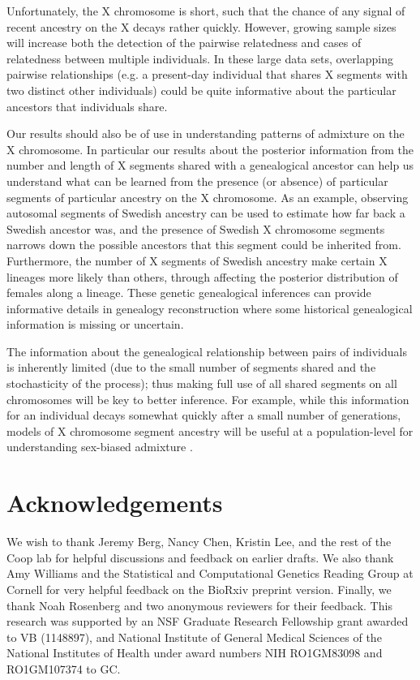 \documentclass[11pt]{article}
\begin{document}
Unfortunately, the X chromosome is short, such that the chance of any signal of
recent ancestry on the X decays rather quickly. However, growing sample sizes
will increase both the detection of the pairwise relatedness and cases of
relatedness between multiple individuals. In these large data sets, overlapping
pairwise relationships (e.g. a present-day individual that shares X segments
with two distinct other individuals) could be quite informative about the
particular ancestors that individuals share. 

Our results should also be of use in understanding patterns of admixture on the
X chromosome. In particular our results about the posterior information from
the number and length of X segments shared with a genealogical ancestor can
help us understand what can be learned from the presence (or absence) of
particular segments of particular ancestry on the X chromosome. As an example,
observing autosomal segments of Swedish ancestry can be used to estimate how
far back a Swedish ancestor was, and the presence of Swedish X chromosome
segments narrows down the possible ancestors that this segment could be
inherited from. Furthermore, the number of X segments of Swedish ancestry make
certain X lineages more likely than others, through affecting the posterior
distribution of females along a lineage. These genetic genealogical inferences
can provide informative details in genealogy reconstruction where some
historical genealogical information is missing or uncertain.

The information about the genealogical relationship between pairs of
individuals is inherently limited (due to the small number of segments shared
and the stochasticity of the process); thus making full use of all shared
segments on all chromosomes will be key to better inference.  For example,
while this information for an individual decays somewhat quickly after a small
number of generations, models of X chromosome segment ancestry will be useful
at a population-level for understanding sex-biased admixture
\citep{bryc2010genome,Goldberg:2015ja,Shringarpure039347}.

\section{Acknowledgements}

We wish to thank Jeremy Berg, Nancy Chen, Kristin Lee, and the rest of the Coop
lab for helpful discussions and feedback on earlier drafts. We also thank Amy
Williams and the Statistical and Computational Genetics Reading Group at
Cornell for very helpful feedback on the BioRxiv preprint version. Finally, we
thank Noah Rosenberg and two anonymous reviewers for their feedback.
%
This research was supported by an NSF Graduate Research Fellowship grant
awarded to VB (1148897), and National Institute of General Medical
Sciences of the National Institutes of Health under award numbers NIH
RO1GM83098 and RO1GM107374 to GC.
\end{document}
